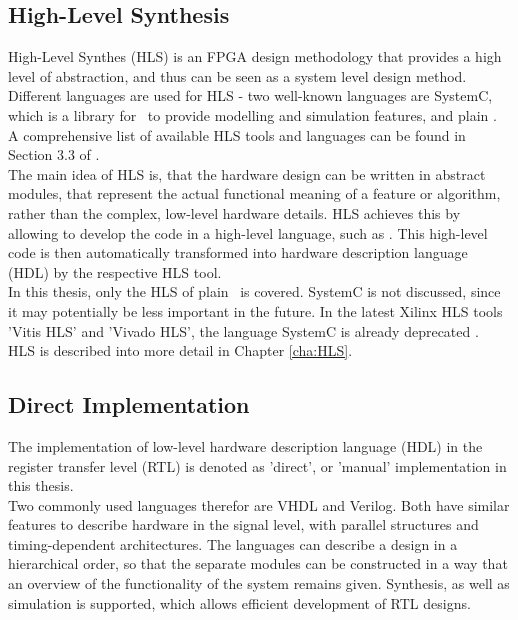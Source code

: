 \subsection{High-Level Synthesis}

High-Level Synthes (HLS) is an FPGA design methodology that provides a high level of abstraction, and thus can be seen as a system level design method.
Different languages are used for HLS - two well-known languages are SystemC, which is a library for \cplusplus\ to provide modelling and simulation features, and plain \cplusplus.
A comprehensive list of available HLS tools and languages can be found in Section 3.3 of \cite{2016FfSP}.\\

The main idea of HLS is, that the hardware design can be written in abstract modules, that represent the actual functional meaning of a feature or algorithm, rather than the complex, low-level hardware details.
HLS achieves this by allowing to develop the code in a high-level language, such as \cplusplus.
This high-level code is then automatically transformed into hardware description language (HDL) by the respective HLS tool.\\

In this thesis, only the HLS of plain \cplusplus\ is covered.
SystemC is not discussed, since it may potentially be less important in the future.
In the latest Xilinx HLS tools 'Vitis HLS' and 'Vivado HLS', the language SystemC is already deprecated \cite{VivadoHlsSystemC}.\\

\noindent
HLS is described into more detail in Chapter \ref{cha:HLS}.


\subsection{Direct Implementation}

The implementation of low-level hardware description language (HDL) in the register transfer level (RTL) is denoted as 'direct', or 'manual' implementation in this thesis.\\

Two commonly used languages therefor are VHDL and Verilog.
Both have similar features to describe hardware in the signal level, with parallel structures and timing-dependent architectures.
The languages can describe a design in a hierarchical order, so that the separate modules can be constructed in a way that an overview of the functionality of the system remains given.
Synthesis, as well as simulation is supported, which allows efficient development of RTL designs.\\

